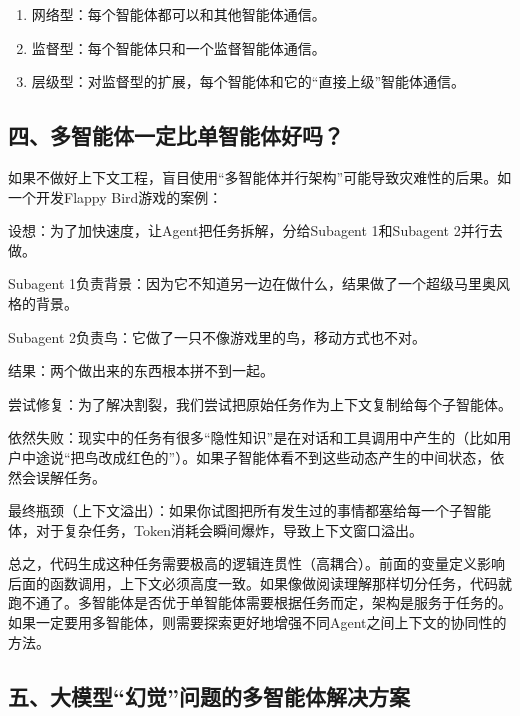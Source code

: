 \begin{enumerate}
\def\labelenumi{\arabic{enumi}.}
\item
  网络型：每个智能体都可以和其他智能体通信。
\item
  监督型：每个智能体只和一个监督智能体通信。
\item
  层级型：对监督型的扩展，每个智能体和它的``直接上级''智能体通信。
\end{enumerate}

\hypertarget{ux56dbux591aux667aux80fdux4f53ux4e00ux5b9aux6bd4ux5355ux667aux80fdux4f53ux597dux5417}{%
\subsection{四、多智能体一定比单智能体好吗？}\label{ux56dbux591aux667aux80fdux4f53ux4e00ux5b9aux6bd4ux5355ux667aux80fdux4f53ux597dux5417}}

如果不做好上下文工程，盲目使用``多智能体并行架构''可能导致灾难性的后果。如一个开发Flappy Bird游戏的案例：

设想：为了加快速度，让Agent把任务拆解，分给Subagent 1和Subagent 2并行去做。

Subagent 1负责背景：因为它不知道另一边在做什么，结果做了一个超级马里奥风格的背景。

Subagent 2负责鸟：它做了一只不像游戏里的鸟，移动方式也不对。

结果：两个做出来的东西根本拼不到一起。

尝试修复：为了解决割裂，我们尝试把原始任务作为上下文复制给每个子智能体。

依然失败：现实中的任务有很多``隐性知识''是在对话和工具调用中产生的（比如用户中途说``把鸟改成红色的''）。如果子智能体看不到这些动态产生的中间状态，依然会误解任务。

最终瓶颈（上下文溢出）：如果你试图把所有发生过的事情都塞给每一个子智能体，对于复杂任务，Token消耗会瞬间爆炸，导致上下文窗口溢出。

总之，代码生成这种任务需要极高的逻辑连贯性（高耦合）。前面的变量定义影响后面的函数调用，上下文必须高度一致。如果像做阅读理解那样切分任务，代码就跑不通了。多智能体是否优于单智能体需要根据任务而定，架构是服务于任务的。如果一定要用多智能体，则需要探索更好地增强不同Agent之间上下文的协同性的方法。

\hypertarget{ux4e94ux5927ux6a21ux578bux5e7bux89c9ux95eeux9898ux7684ux591aux667aux80fdux4f53ux89e3ux51b3ux65b9ux6848}{%
\subsection{五、大模型``幻觉''问题的多智能体解决方案}\label{ux4e94ux5927ux6a21ux578bux5e7bux89c9ux95eeux9898ux7684ux591aux667aux80fdux4f53ux89e3ux51b3ux65b9ux6848}}

